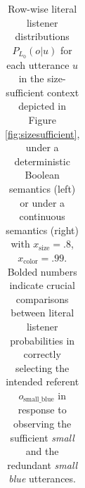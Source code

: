 \documentclass[11pt]{article}
\newcommand{\figref}[1]{Figure \ref{#1}}
\begin{document}
\begin{table}
\caption{Row-wise literal listener distributions $P_{L_0}(o | u)$ for each utterance $u$ in the size-sufficient context depicted in \figref{fig:sizesufficient}, under a deterministic Boolean semantics (left) or under a continuous semantics (right) with  $x_{\text{size}} = .8$, $x_{\text{color}} = .99$. Bolded numbers indicate crucial comparisons between literal listener probabilities in correctly selecting the intended referent $o_{\text{small\_blue}}$ in response to observing the sufficient \emph{small} and the redundant \emph{small blue} utterances.}
\begin{tabular}{l r r r r r r}

\end{tabular}
\end{table}
\end{document}
